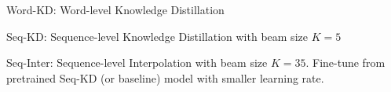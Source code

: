 \documentclass{beamer}
\let\tempone\itemize
\let\temptwo\enditemize
\renewenvironment{itemize}{\tempone\addtolength{\itemsep}{0.5\baselineskip}}{\temptwo}
\newcommand{\air}{\vspace{0.25cm}}
\begin{document}





\begin{frame}
\centerline{}
\begin{itemize}
\item Word-KD: Word-level Knowledge Distillation
\item Seq-KD: Sequence-level Knowledge Distillation with beam size $K=5$
\item Seq-Inter: Sequence-level Interpolation with beam size $K=35$. Fine-tune
from pretrained Seq-KD (or baseline) model with smaller learning rate.
\end{itemize}
\end{frame}
\end{document}
